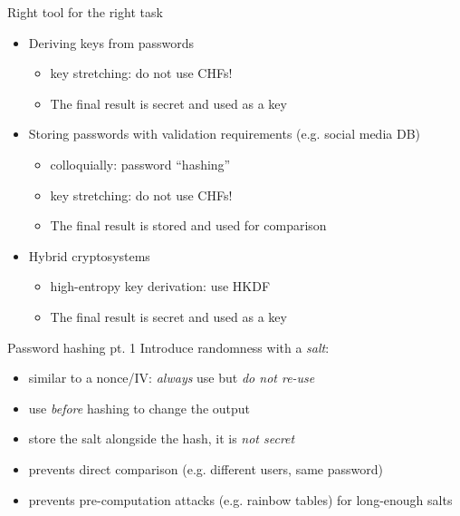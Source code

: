 \begin{frame}{Right tool for the right task}
  \pause
  \begin{itemize}
    \item Deriving keys from passwords
    \begin{itemize}
      \item key stretching: do not use CHFs!
      \item The final result is secret and used as a key
    \end{itemize}
    \pause
    \item Storing passwords with validation requirements (e.g. social media DB)
    \begin{itemize}
      \item colloquially: password \enquote{hashing}
      \item key stretching: do not use CHFs!
      \item The final result is stored and used for comparison
    \end{itemize}
    \pause
    \item Hybrid cryptosystems
    \begin{itemize}
      \item high-entropy key derivation: use HKDF
      \item The final result is secret and used as a key
    \end{itemize}
  \end{itemize}
\end{frame}

\begin{frame}{Password hashing pt. 1}
  Introduce randomness with a \emph{salt}:
  \begin{itemize}[<+(1)->]
    \item similar to a nonce/IV: \emph{always} use but \emph{do not re-use}
    \item use \emph{before} hashing to change the output
    \item store the salt alongside the hash, it is \emph{not secret}
    \item prevents direct comparison (e.g. different users, same password)
    \item prevents pre-computation attacks (e.g. rainbow tables) for long-enough salts
  \end{itemize}
\end{frame}

